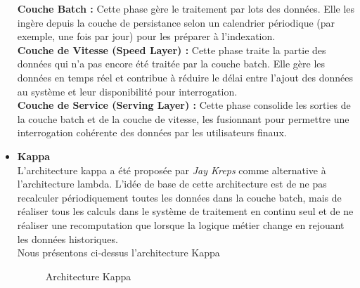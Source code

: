 \documentclass{report}
\begin{document}
\begin{itemize}
\textbf{Couche Batch :} Cette phase gère le traitement par lots des données. Elle les ingère depuis la couche de persistance selon un calendrier périodique (par exemple, une fois par jour) pour les préparer à l'indexation.\\

\textbf{Couche de Vitesse (Speed Layer) :} Cette phase traite la partie des données qui n'a pas encore été traitée par la couche batch. Elle gère les données en temps réel et contribue à réduire le délai entre l'ajout des données au système et leur disponibilité pour interrogation.\\

\textbf{Couche de Service (Serving Layer) :} Cette phase consolide les sorties de la couche batch et de la couche de vitesse, les fusionnant pour permettre une interrogation cohérente des données par les utilisateurs finaux.\\
\cite{[Wingerath et al.,2016}
\vspace*{1cm}
\item {\large\textbf{ Kappa}} \\

L’architecture kappa a été proposée par \textit{Jay Kreps} comme alternative à l’architecture lambda.
L'idée de base de cette architecture est de ne pas recalculer périodiquement toutes les données dans la couche batch, mais de réaliser tous les calculs dans le système de traitement en continu seul et de ne réaliser une recomputation que lorsque la logique métier change en rejouant les données historiques.\cite{Wingerath et al.,2016} \\
Nous présentons ci-dessus l'architecture Kappa

 \begin{figure}[h]
        \centering
        \caption{ Architecture Kappa \cite{[Wingerath et al.,2016}}
        \label{b}
    \end{figure}


\end{itemize}
\newpage
\end{document}
